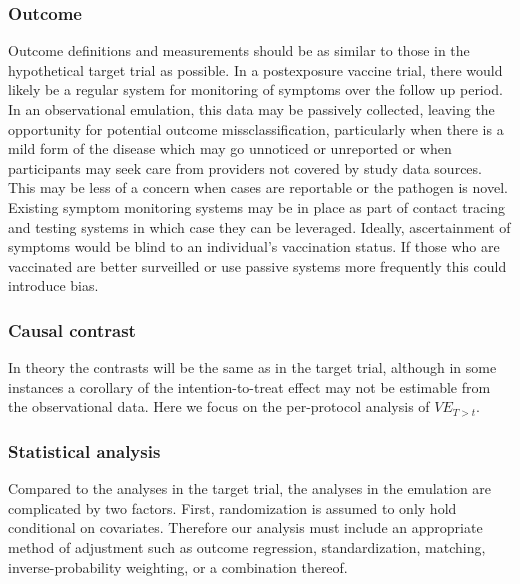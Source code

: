 \documentclass[11pt]{article}
\begin{document}
\subsubsection*{Outcome}
Outcome definitions and measurements should be as similar to those in the hypothetical target trial as possible. In a postexposure vaccine trial, there would likely be a regular system for monitoring of symptoms over the follow up period. In an observational emulation, this data may be passively collected, leaving the opportunity for potential outcome missclassification, particularly when there is a mild form of the disease which may go unnoticed or unreported or when participants may seek care from providers not covered by study data sources. This may be less of a concern when cases are reportable or the pathogen is novel. Existing symptom monitoring systems may be in place as part of contact tracing and testing systems in which case they can be leveraged. Ideally, ascertainment of symptoms would be blind to an individual's vaccination status. If those who are vaccinated are better surveilled or use passive systems more frequently this could introduce bias.

\subsubsection*{Causal contrast}
In theory the contrasts will be the same as in the target trial, although in some instances a corollary of the intention-to-treat effect may not be estimable from the observational data. Here we focus on the per-protocol analysis of $VE_{T > t}$.

\subsubsection*{Statistical analysis}
Compared to the analyses in the target trial, the analyses in the emulation are complicated by two factors. First, randomization is assumed to only hold conditional on covariates. Therefore our analysis must include an appropriate method of adjustment such as outcome regression, standardization, matching, inverse-probability weighting, or a combination thereof. 
\end{document}
